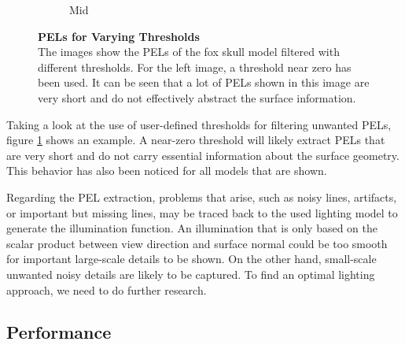 \documentclass[9pt,fleqn,twoside,twocolumn]{stdglobal}
\begin{document}
\begin{figure}[t]
\begin{subfigure}[b]{0.49\linewidth}
        \caption{Mid}
      \end{subfigure}
      \caption{%
        \textbf{PELs for Varying Thresholds}\\
        The images show the PELs of the fox skull model filtered with different thresholds.
        For the left image, a threshold near zero has been used.
        It can be seen that a lot of PELs shown in this image are very short and do not effectively abstract the surface information.
      }
      \label{fig:threshold-effect}
    \end{figure}

    Taking a look at the use of user-defined thresholds for filtering unwanted PELs, figure \ref{fig:threshold-effect} shows an example.
    A near-zero threshold will likely extract PELs that are very short and do not carry essential information about the surface geometry.
    This behavior has also been noticed for all models that are shown.

    Regarding the PEL extraction, problems that arise, such as noisy lines, artifacts, or important but missing lines, may be traced back to the used lighting model to generate the illumination function.
    An illumination that is only based on the scalar product between view direction and surface normal could be too smooth for important large-scale details to be shown.
    On the other hand, small-scale unwanted noisy details are likely to be captured.
    To find an optimal lighting approach, we need to do further research.

  \subsection{Performance}
\end{document}
